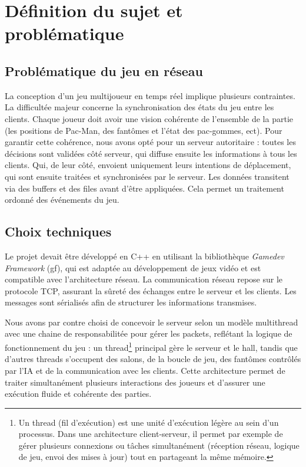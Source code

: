 \documentclass[a4paper, 11pt]{article}
\begin{document}
\newpage


\section{Définition du sujet et problématique}

\subsection{Problématique du jeu en réseau}

La conception d’un jeu multijoueur en temps réel implique plusieurs contraintes. La difficultée majeur concerne la synchronisation des états du jeu entre les clients. Chaque joueur doit avoir une vision cohérente de l’ensemble de la partie (les positions de Pac-Man, des fantômes et l’état des pac-gommes, ect). Pour garantir cette cohérence, nous avons opté pour un serveur autoritaire : toutes les décisions sont validées côté serveur, qui diffuse ensuite les informations à tous les clients. Qui, de leur côté, envoient uniquement leurs intentions de déplacement, qui sont ensuite traitées et synchronisées par le serveur. Les données transitent via des buffers et des files avant d’être appliquées. Cela permet un traitement ordonné des événements du jeu.

\subsection{Choix techniques}

Le projet devait être développé en C++ en utilisant la bibliothèque \textit{Gamedev Framework} (gf), qui est adaptée au développement de jeux vidéo et est compatible avec l’architecture réseau. La communication réseau repose sur le protocole TCP, assurant la sûreté des échanges entre le serveur et les clients. Les messages sont sérialisés afin de structurer les informations transmises.

Nous avons par contre choisi de concevoir le serveur selon un modèle multithread avec une chaine de responsabilitée pour gérer les packets, reflétant la logique de fonctionnement du jeu : un thread\footnote{Un thread (fil d’exécution) est une unité d’exécution légère au sein d’un processus. Dans une architecture client-serveur, il permet par exemple de gérer plusieurs connexions ou tâches simultanément (réception réseau, logique de jeu, envoi des mises à jour) tout en partageant la même mémoire.} principal gère le serveur et le hall, tandis que d’autres threads s’occupent des salons, de la boucle de jeu, des fantômes contrôlés par l’IA et de la communication avec les clients. Cette architecture permet de traiter simultanément plusieurs interactions des joueurs et d’assurer une exécution fluide et cohérente des parties.
\end{document}
